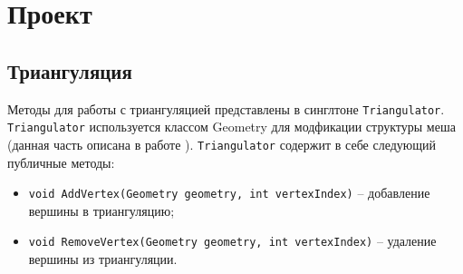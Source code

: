 \documentclass{fefu}
\begin{document}
\section{Проект}
\subsection{Триангуляция}
Методы для работы с триангуляцией представлены в синглтоне \texttt{Triangulator}. \texttt{Triangulator} используется
классом Geometry для модфикации структуры меша (данная часть описана в работе \cite{Gomenyuk}). \texttt{Triangulator}
содержит в себе следующий публичные методы:
\begin{itemize}
    \item \texttt{void AddVertex(Geometry geometry, int vertexIndex)} -- добавление вершины в триангуляцию;
    \item \texttt{void RemoveVertex(Geometry geometry, int vertexIndex)} -- удаление вершины из триангуляции.
\end{itemize}
\end{document}
